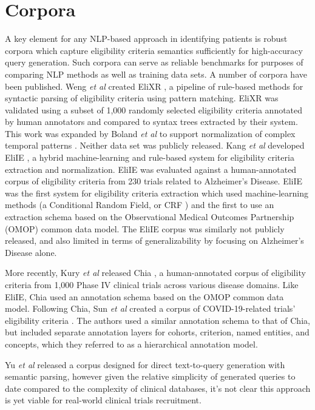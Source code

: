 \documentclass[../main.tex]{subfiles}
\begin{document}
\section{Corpora}

A key element for any NLP-based approach in identifying patients is robust corpora which capture eligibility criteria semantics sufficiently for high-accuracy query generation. Such corpora can serve as reliable benchmarks for purposes of comparing NLP methods as well as training data sets. A number of corpora have been published. Weng \textit{et al} created EliXR \cite{weng2011elixr}, a pipeline of rule-based methods for syntactic parsing of eligibility criteria using pattern matching. EliXR was validated using a subset of 1,000 randomly selected eligibility criteria annotated by human annotators and compared to syntax trees extracted by their system. This work was expanded by Boland \textit{et al} to support normalization of complex temporal patterns \cite{boland2012elixrtime}. Neither data set was publicly released. Kang \textit{et al} developed EliIE \cite{kang2017eliie}, a hybrid machine-learning and rule-based system for eligibility criteria extraction and normalization. EliIE was evaluated against a human-annotated corpus of eligibility criteria from 230 trials related to Alzheimer's Disease. EliIE was the first system for eligibility criteria extraction which used machine-learning methods (a Conditional Random Field, or CRF \cite{sutton2012introduction}) and the first to use an extraction schema based on the Observational Medical Outcomes Partnership (OMOP) \cite{hripcsak2015observational} common data model. The EliIE corpus was similarly not publicly released, and also limited in terms of generalizability by focusing on Alzheimer's Disease alone. 

More recently, Kury \textit{et al} released Chia \cite{kury2020chia}, a human-annotated corpus of eligibility criteria from 1,000 Phase IV clinical trials across various disease domains. Like EliIE, Chia used an annotation schema based on the OMOP common data model. Following Chia, Sun \textit{et al} created a corpus of COVID-19-related trials' eligibility criteria \cite{sun2021building}. The authors used a similar annotation schema to that of Chia, but included separate annotation layers for cohorts, criterion, named entities, and concepts, which they referred to as a hierarchical annotation model. 

Yu \textit{et al} \cite{yu2020} released a corpus designed for direct text-to-query generation with semantic parsing, however given the relative simplicity of generated queries to date compared to the complexity of clinical databases, it's not clear this approach is yet viable for real-world clinical trials recruitment.
\end{document}
